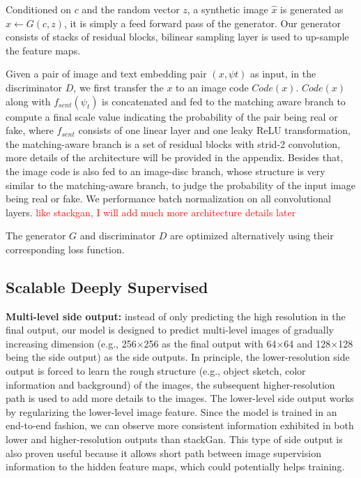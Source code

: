 \documentclass[10pt,twocolumn,letterpaper]{article}
\begin{document}
Conditioned on $c$ and the random vector $z$, a synthetic image $\hat{x}$ is generated as $\hat{x}\leftarrow G(c,z)$, it is simply a feed forward pass of the generator. Our generator consists of stacks of residual blocks, bilinear sampling layer is used to up-sample the feature maps. 

Given a pair of image and text embedding pair $(x, \psi{t})$ as input, in the discriminator $D$, we first transfer the $x$  to an image code $Code(x)$. $Code(x)$ along with $f_{sent}(\psi_t)$ is concatenated and fed to the matching aware branch to compute a final scale value indicating the probability of the pair being real or fake, where $f_{sent}$ consists of one linear layer and one leaky ReLU transformation,  the matching-aware branch is a set of residual blocks with strid-2 convolution, more details of the architecture will be provided in the appendix. Besides that, the image code is also fed to an image-disc branch, whose structure is very similar to the matching-aware branch, to judge the probability of the input image being real or fake. We performance batch normalization on all convolutional layers. \textcolor{red}{like stackgan, I will add much more architecture details later}

The generator $G$ and discriminator $D$ are optimized alternatively using their corresponding loss function. 

 \subsection{Scalable Deeply Supervised}
 \textbf{Multi-level side output:} instead of only predicting the high resolution in the final output, our model is designed to predict multi-level images of gradually increasing dimension (e.g., 256$\times$256 as the final output with 64$\times$64 and 128$\times$128 being the side output) as the side outputs. In principle, the lower-resolution side output is forced to learn the rough structure (e.g., object sketch, color information and background) of the images, the subsequent higher-resolution path is used to add more details to the images. The lower-level side output works by regularizing the lower-level image feature. Since the model is trained in an end-to-end fashion, we can observe more consistent information exhibited in both lower and higher-resolution outputs than stackGan\cite{han2017stackgan}. This type of side output is also proven useful because it allows short path between image supervision information to the hidden feature maps, which could potentially helps training.
\end{document}
